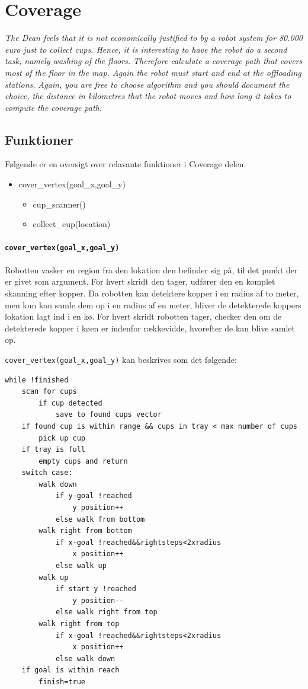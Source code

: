 \section{Coverage}
\label{sec:cov}
\textit{The Dean feels that it is not economically justified to by a robot system for 80.000 euro just to collect cups. Hence, it is interesting to have the robot do a second task, namely washing of the floors. Therefore calculate a coverage path that covers most of the floor in the map. Again the robot must start and end at the offloading stations.
Again, you are free to choose algorithm and you should document the choice, the distance in kilometres that the robot moves and how long it takes to compute the coverage path.}


\subsection{Funktioner}

Følgende er en oversigt over relavante funktioner i Coverage delen.

\begin{itemize}
	\item cover\_vertex(goal\_x,goal\_y)
	\begin{itemize}
		\item cup\_scanner()
		\item collect\_cup(location)
	\end{itemize}
	
\end{itemize}

\paragraph{\texttt{cover\_vertex(goal\_x,goal\_y)}}
Robotten vasker en region fra den lokation den befinder sig på, til det punkt der er givet som argument. For hvert skridt den tager, udfører den en komplet skanning efter kopper. Da robotten kan detektere kopper i en radius af to meter, men kun kan samle dem op i en radius af en meter, bliver de detekterede koppers lokation lagt ind i en kø. For hvert skridt robotten tager, checker den om de detekterede kopper i køen er indenfor rækkevidde, hvorefter de kan blive samlet op.

\texttt{cover\_vertex(goal\_x,goal\_y)} kan beskrives som det følgende:
\begin{lstlisting}
while !finished
	scan for cups
		if cup detected
			save to found cups vector
	if found cup is within range && cups in tray < max number of cups
		pick up cup
	if tray is full
		empty cups and return
	switch case:
		walk down 
			if y-goal !reached
				y position++
			else walk from bottom
		walk right from bottom 
			if x-goal !reached&&rightsteps<2xradius
				x position++
			else walk up
		walk up
			if start y !reached
				y position--
			else walk right from top
		walk right from top
			if x-goal !reached&&rightsteps<2xradius
				x position++
			else walk down
	if goal is within reach
		finish=true
\end{lstlisting}


